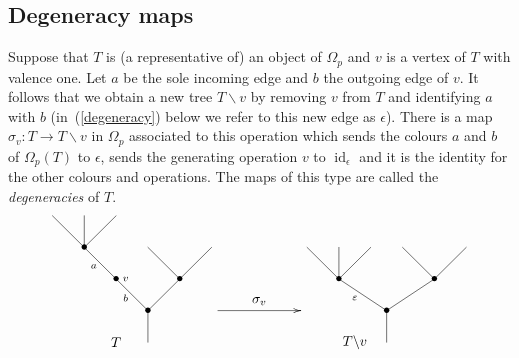 \documentclass[a4paper]{amsart}
\theoremstyle{plain}
\theoremstyle{definition}
\theoremstyle{remark}
\DeclareMathOperator{\id}{id}
\newcommand{\rpd}{\Omega_p}
\newcommand{\To}{\longrightarrow}
\numberwithin{equation}{section}
\numberwithin{figure}{section}
\begin{document}
\subsection{Degeneracy maps}
Suppose that $T$ is (a representative of) an object of $\rpd$ and
$v$ is a vertex of $T$ with valence one. Let $a$ be the sole
incoming edge and $b$ the outgoing edge of $v$. It follows that we
obtain a new tree $T\backslash v$ by removing $v$ from $T$ and
identifying $a$ with $b$ (in~(\ref{degeneracy}) below we refer
to this new edge as $\epsilon$). There is a map $\sigma_v:T \To
    T\backslash v$ in $\rpd$ associated to this operation which sends
the colours $a$ and $b$ of $\Omega_p(T)$ to $\epsilon$, sends the
generating operation $v$ to $\id_\epsilon$ and it is the identity
for the other colours and operations. The maps of this type are called the \emph{degeneracies} of $T$.
\begin{equation}
    \xy<0.08cm,0cm>:
    (0,20)*{}="1";
    (10,20)*=0{}="2";
    (20,20)*=0{}="3";
    (10,10)*=0{\bullet}="4";
    (20,0)*=0{\bullet}="5";
    (30,-10)*=0{\bullet}="6";
    (40,0)*=0{\bullet}="7";
    (30,10)*=0{}="8";
    (50,10)*=0{}="9";
    (30,-20)*=0{}="10";
    (80,10)*=0{}="11";
    (90,10)*=0{}="12";
    (100,10)*=0{}="13";
    (90,0)*=0{\bullet}="14";
    (105,-10)*=0{\bullet}="15";
    (120,0)*=0{\bullet}="16";
    (110,10)*=0{}="17";
    (130,10)*=0{}="18";
    (105,-20)*=0{}="19";
    (13,4)*{\scriptstyle a};
    (23,-6)*{\scriptstyle b};
    (23,0)*{\scriptstyle v};
    (95,-6)*{\scriptstyle \varepsilon};
    (65,-7)*{\sigma_v};
    "1";"4" **\dir{-};
    "2";"4" **\dir{-};
    "3";"4" **\dir{-};
    "4";"5" **\dir{-};
    "5";"6" **\dir{-};
    "6";"7" **\dir{-};
    "6";"10" **\dir{-};
    "7";"8" **\dir{-};
    "7";"9" **\dir{-};
    "11";"14" **\dir{-};
    "12";"14" **\dir{-};
    "13";"14" **\dir{-};
    "14";"15" **\dir{-};
    "15";"16" **\dir{-};
    "16";"17" **\dir{-};
    "16";"18" **\dir{-};
    "15";"19" **\dir{-};
    {\ar(52, -10)*{};(78,-10)*{}};
    (20,-20)*{T};
    (95,-20)*{T\backslash v};
    \endxy
    \label{degeneracy}
\end{equation}
\end{document}
